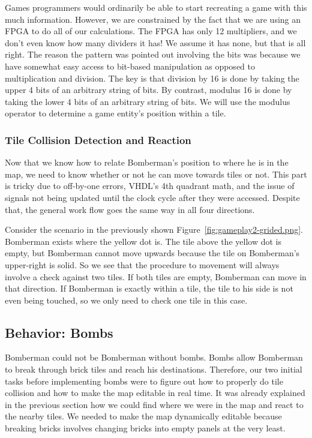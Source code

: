 \documentclass[10pt,a4paper]{article}
\begin{document}
Games programmers would ordinarily be able to start recreating a game with this much information. However, we are constrained by the fact that we are using an FPGA to do all of our calculations. The FPGA has only 12 multipliers, and we don't even know how many dividers it has! We assume it has none, but that is all right. The reason the pattern was pointed out involving the bits was because we have somewhat easy access to bit-based manipulation as opposed to multiplication and division. The key is that division by 16 is done by taking the upper 4 bits of an arbitrary string of bits. By contrast, modulus 16 is done by taking the lower 4 bits of an arbitrary string of bits. We will use the modulus operator to determine a game entity's position within a tile.

\subsubsection{Tile Collision Detection and Reaction}
Now that we know how to relate Bomberman's position to where he is in the map, we need to know whether or not he can move towards tiles or not. This part is tricky due to off-by-one errors, VHDL's 4th quadrant math, and the issue of signals not being updated until the clock cycle after they were accessed. Despite that, the general work flow goes the same way in all four directions.

Consider the scenario in the previously shown Figure~\ref{fig:gameplay2-grided.png}. Bomberman exists where the yellow dot is. The tile above the yellow dot is empty, but Bomberman cannot move upwards because the tile on Bomberman's upper-right is solid. So we see that the procedure to movement will always involve a check against two tiles. If both tiles are empty, Bomberman can move in that direction. If Bomberman is exactly within a tile, the tile to his side is not even being touched, so we only need to check one tile in this case.

\subsection{Behavior: Bombs}

Bomberman could not be Bomberman without bombs. Bombs allow Bomberman to break through brick tiles and reach his destinations. Therefore, our two initial tasks before implementing bombs were to figure out how to properly do tile collision and how to make the map editable in real time. It was already explained in the previous section how we could find where we were in the map and react to the nearby tiles. We needed to make the map dynamically editable because breaking bricks involves changing bricks into empty panels at the very least.
\end{document}
